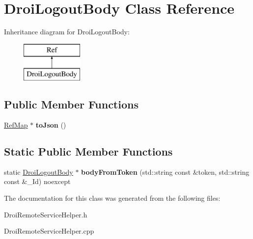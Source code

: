 \hypertarget{class_droi_logout_body}{}\section{Droi\+Logout\+Body Class Reference}
\label{class_droi_logout_body}
Inheritance diagram for Droi\+Logout\+Body\+:\begin{figure}[H]
\begin{center}
\leavevmode
\includegraphics[height=2.000000cm]{d7/d25/class_droi_logout_body}
\end{center}
\end{figure}
\subsection*{Public Member Functions}
\begin{DoxyCompactItemize}
\item 
\mbox{\label{class_droi_logout_body_aa1d2e211bf4d42df38e2d1015fbb6ecc}} 
\hyperlink{class_ref_map}{Ref\+Map} $\ast$ {\bfseries to\+Json} ()
\end{DoxyCompactItemize}
\subsection*{Static Public Member Functions}
\begin{DoxyCompactItemize}
\item 
\mbox{\label{class_droi_logout_body_ad325baf7921764c78da56e1c72a9805c}} 
static \hyperlink{class_droi_logout_body}{Droi\+Logout\+Body} $\ast$ {\bfseries body\+From\+Token} (std\+::string const \&token, std\+::string const \&\+\_\+\+Id) noexcept
\end{DoxyCompactItemize}


The documentation for this class was generated from the following files\+:\begin{DoxyCompactItemize}
\item 
Droi\+Remote\+Service\+Helper.\+h\item 
Droi\+Remote\+Service\+Helper.\+cpp\end{DoxyCompactItemize}
